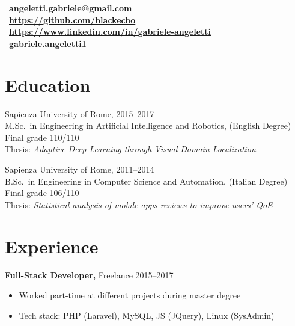 \documentclass[margin]{res}
\begin{document}
 
 
\address{Via A. Moro 9b \\ Rieti, RI, 02100  \\ (+39) 340 7082875}
 
\begin{resume}

\section{}
\faEnvelope~\textbf{angeletti.gabriele@gmail.com} \\[5pt]
\faGithub~\textbf{\url{https://github.com/blackecho}} \\[5pt]
\faLinkedin~\textbf{\url{https://www.linkedin.com/in/gabriele-angeletti}} \\[5pt]
\faSkype~\textbf{gabriele.angeletti1}

 
\section{Education}
Sapienza University of Rome, \hfill 2015--2017 \\
M.Sc.\ in Engineering in Artificial Intelligence and Robotics, (English Degree) \\
Final grade 110/110 \\
Thesis: \textit{Adaptive Deep Learning through Visual Domain Localization}

Sapienza University of Rome, \hfill 2011--2014 \\
B.Sc.\ in Engineering in Computer Science and Automation, (Italian Degree) \\
Final grade 106/110 \\
Thesis: \textit{Statistical analysis of mobile apps reviews to improve users' QoE}

\section{Experience}
    {\bf Full-Stack Developer,} Freelance \hfill 2015--2017
    \begin{itemize} \itemsep-2pt %
        \item Worked part-time at different projects during master degree
        \item Tech stack: PHP (Laravel), MySQL, JS (JQuery), Linux (SysAdmin)
    \end{itemize}


\end{resume}
\end{document}
